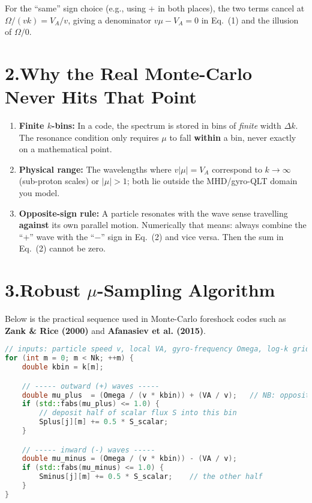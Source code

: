 For the ``same'' sign choice (e.g., using $+$ in both places), the two terms cancel at $\Omega/(v k) = V_A/v$, giving a denominator $v \mu - V_A = 0$ in Eq.~(1) and the illusion of $\Omega/0$.

\section*{2.\quad Why the Real Monte-Carlo Never Hits That Point}

\begin{enumerate}
\item \textbf{Finite $k$-bins:} In a code, the spectrum is stored in bins of \textit{finite} width $\Delta k$.
The resonance condition only requires $\mu$ to fall \textbf{within} a bin, never exactly on a mathematical point.
\item \textbf{Physical range:} The wavelengths where $v|\mu| = V_A$ correspond to $k \to \infty$ (sub-proton scales) or $|\mu| > 1$; both lie outside the MHD/gyro-QLT domain you model.
\item \textbf{Opposite-sign rule:} A particle resonates with the wave sense travelling \textbf{against} its own parallel motion.
Numerically that means: always combine the ``$+$'' wave with the ``$-$'' sign in Eq.~(2) and vice versa.
Then the sum in Eq.~(2) cannot be zero.
\end{enumerate}

\section*{3.\quad Robust $\mu$-Sampling Algorithm}

Below is the practical sequence used in Monte-Carlo foreshock codes such as \textbf{Zank \& Rice (2000)} and \textbf{Afanasiev et al. (2015)}.

\begin{lstlisting}[language=C++, basicstyle=\ttfamily\small]
// inputs: particle speed v, local VA, gyro-frequency Omega, log-k grid k[m]
for (int m = 0; m < Nk; ++m) {
    double kbin = k[m];

    // ----- outward (+) waves -----
    double mu_plus  = (Omega / (v * kbin)) + (VA / v);   // NB: opposite sign!
    if (std::fabs(mu_plus) <= 1.0) {
        // deposit half of scalar flux S into this bin
        Splus[j][m] += 0.5 * S_scalar;
    }

    // ----- inward (-) waves -----
    double mu_minus = (Omega / (v * kbin)) - (VA / v);
    if (std::fabs(mu_minus) <= 1.0) {
        Sminus[j][m] += 0.5 * S_scalar;    // the other half
    }
}
\end{lstlisting}

